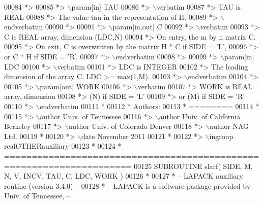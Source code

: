 \begin{DoxyCode}
00084 \textcolor{comment}{*>}
00085 \textcolor{comment}{*> \(\backslash\)param[in] TAU}
00086 \textcolor{comment}{*> \(\backslash\)verbatim}
00087 \textcolor{comment}{*>          TAU is REAL}
00088 \textcolor{comment}{*>          The value tau in the representation of H.}
00089 \textcolor{comment}{*> \(\backslash\)endverbatim}
00090 \textcolor{comment}{*>}
00091 \textcolor{comment}{*> \(\backslash\)param[in,out] C}
00092 \textcolor{comment}{*> \(\backslash\)verbatim}
00093 \textcolor{comment}{*>          C is REAL array, dimension (LDC,N)}
00094 \textcolor{comment}{*>          On entry, the m by n matrix C.}
00095 \textcolor{comment}{*>          On exit, C is overwritten by the matrix H * C if SIDE = 'L',}
00096 \textcolor{comment}{*>          or C * H if SIDE = 'R'.}
00097 \textcolor{comment}{*> \(\backslash\)endverbatim}
00098 \textcolor{comment}{*>}
00099 \textcolor{comment}{*> \(\backslash\)param[in] LDC}
00100 \textcolor{comment}{*> \(\backslash\)verbatim}
00101 \textcolor{comment}{*>          LDC is INTEGER}
00102 \textcolor{comment}{*>          The leading dimension of the array C. LDC >= max(1,M).}
00103 \textcolor{comment}{*> \(\backslash\)endverbatim}
00104 \textcolor{comment}{*>}
00105 \textcolor{comment}{*> \(\backslash\)param[out] WORK}
00106 \textcolor{comment}{*> \(\backslash\)verbatim}
00107 \textcolor{comment}{*>          WORK is REAL array, dimension}
00108 \textcolor{comment}{*>                         (N) if SIDE = 'L'}
00109 \textcolor{comment}{*>                      or (M) if SIDE = 'R'}
00110 \textcolor{comment}{*> \(\backslash\)endverbatim}
00111 \textcolor{comment}{*}
00112 \textcolor{comment}{*  Authors:}
00113 \textcolor{comment}{*  ========}
00114 \textcolor{comment}{*}
00115 \textcolor{comment}{*> \(\backslash\)author Univ. of Tennessee }
00116 \textcolor{comment}{*> \(\backslash\)author Univ. of California Berkeley }
00117 \textcolor{comment}{*> \(\backslash\)author Univ. of Colorado Denver }
00118 \textcolor{comment}{*> \(\backslash\)author NAG Ltd. }
00119 \textcolor{comment}{*}
00120 \textcolor{comment}{*> \(\backslash\)date November 2011}
00121 \textcolor{comment}{*}
00122 \textcolor{comment}{*> \(\backslash\)ingroup realOTHERauxiliary}
00123 \textcolor{comment}{*}
00124 \textcolor{comment}{*  =====================================================================}
00125 \textcolor{keyword}{      SUBROUTINE }slarf( SIDE, M, N, V, INCV, TAU, C, LDC, WORK )
00126 \textcolor{comment}{*}
00127 \textcolor{comment}{*  -- LAPACK auxiliary routine (version 3.4.0) --}
00128 \textcolor{comment}{*  -- LAPACK is a software package provided by Univ. of Tennessee,    --}

\end{DoxyCode}
